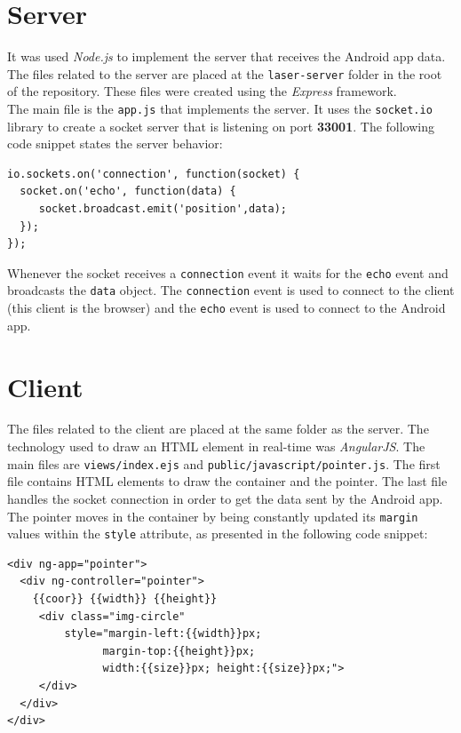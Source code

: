 \documentclass{llncs}
\begin{document}
\section{Server}

It was used \textit{Node.js} to implement the server that receives the Android app data. The files related to the server are placed at the \texttt{laser-server} folder in the root of the repository. These files were created using the \textit{Express} framework.
\\

\noindent The main file is the \texttt{app.js} that implements the server. It uses the \texttt{socket.io} library to create a socket server that is listening on port \textbf{33001}. The following code snippet states the server behavior:

\begin{lstlisting}
io.sockets.on('connection', function(socket) {
  socket.on('echo', function(data) {
     socket.broadcast.emit('position',data);
  });
});
\end{lstlisting}

Whenever the socket receives a \texttt{connection} event it waits for the \texttt{echo} event and broadcasts the \texttt{data} object. The \texttt{connection} event is used to connect to the client (this client is the browser) and the \texttt{echo} event is used to connect to the Android app.

\section{Client}

The files related to the client are placed at the same folder as the server. The technology used to draw an HTML element in real-time was \textit{AngularJS}. The main files are \texttt{views/index.ejs} and \texttt{public/javascript/pointer.js}. The first file contains HTML elements to draw the container and the pointer. The last file handles the socket connection in order to get the data sent by the Android app.
\\

\noindent The pointer moves in the container by being constantly updated its \texttt{margin} values within the \texttt{style} attribute, as presented in the following code snippet:

\begin{lstlisting}
<div ng-app="pointer">
  <div ng-controller="pointer">
    {{coor}} {{width}} {{height}}
     <div class="img-circle" 
         style="margin-left:{{width}}px; 
               margin-top:{{height}}px; 
               width:{{size}}px; height:{{size}}px;">
     </div>
  </div>
</div>
\end{lstlisting}
\end{document}
